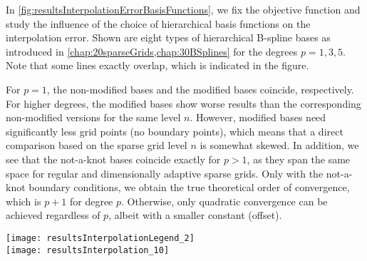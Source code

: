 In \cref{fig:resultsInterpolationErrorBasisFunctions},
we fix the objective function and study the influence of the choice
of hierarchical basis functions on the interpolation error.
Shown are eight types of hierarchical B-spline bases as introduced in
\cref{chap:20sparseGrids,chap:30BSplines} for the degrees $p = 1, 3, 5$.
Note that some lines exactly overlap, which is indicated in
the figure.

For $p = 1$, the non-modified bases and the modified bases coincide,
respectively.
For higher degrees, the modified bases show worse results than
the corresponding non-modified versions for the same level $n$.
However, modified bases need significantly less grid points
(no boundary points),
which means that a direct comparison based on the sparse grid level $n$
is somewhat skewed.
%
In addition, we see that the not-a-knot bases coincide exactly for $p > 1$,
as they span the same space for regular and
dimensionally adaptive sparse grids.
Only with the not-a-knot boundary conditions, we obtain the true
theoretical order of convergence, which is $p + 1$ for degree $p$.
Otherwise, only quadratic convergence can be achieved regardless of $p$,
albeit with a smaller constant (offset).

\begin{SCfigure}
  \begin{minipage}{102mm}%
    \hspace*{8mm}%
    \texttt{[image: resultsInterpolationLegend\_2]}\\[2mm]%
    \texttt{[image: resultsInterpolation\_10]}%
  \end{minipage}%
  \caption[Relative interpolation error for different basis functions]{%
    Relative $\Ltwo$ interpolation error
    $\normLtwo{\objfun - \sgintp}/\normLtwo{\objfun}$
    for the bivariate Alp02 function ($d = 2$)
    using different hierarchical basis functions
    $\basis{\*l,\*i}$ \emph{(colors)}
    of different degrees $p$ \emph{(line styles/markers)} and
    regular sparse grids $\regsgset{n}{d}$ of different levels $n$.\\
    The basis functions shown here involve
    standard \emph{(no superscript),}
    not-a-knot \emph{($\mathrm{nak}$),}
    modified \emph{($\mathrm{mod}$),}
    fundamental \emph{($\mathrm{fs}$),} and
    weakly fundamental \emph{($\mathrm{wfs}$)}
    splines as well as the combinations
    introduced in \cref{chap:20sparseGrids,chap:30BSplines}.%
  }%
  \label{fig:resultsInterpolationErrorBasisFunctions}%
\end{SCfigure}


